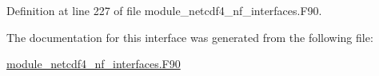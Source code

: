 Definition at line 227 of file module\+\_\+netcdf4\+\_\+nf\+\_\+interfaces.\+F90.



The documentation for this interface was generated from the following file\+:\begin{DoxyCompactItemize}
\item 
\hyperlink{module__netcdf4__nf__interfaces_8F90}{module\+\_\+netcdf4\+\_\+nf\+\_\+interfaces.\+F90}\end{DoxyCompactItemize}
